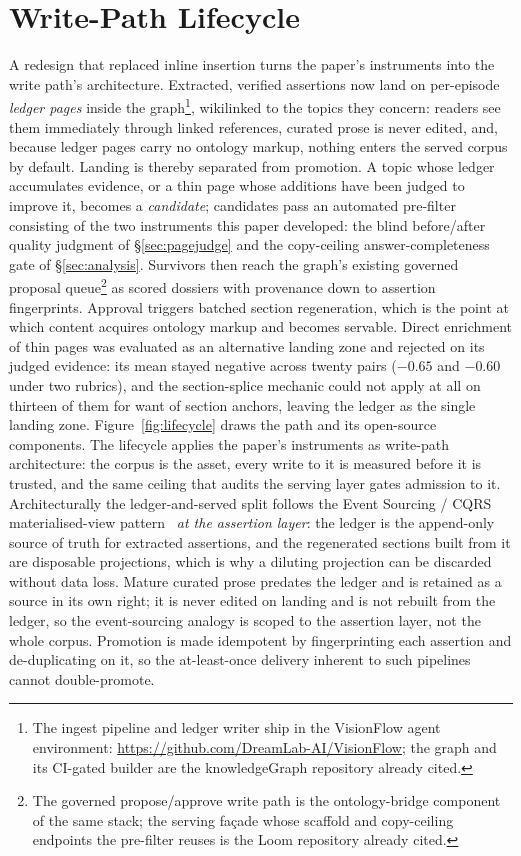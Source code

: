 \documentclass[10pt,twocolumn]{article}
\begin{document}
\section{Write-Path Lifecycle}\label{sec:lifecycle}
A redesign that replaced inline insertion turns the paper's instruments into the write path's
architecture. Extracted, verified assertions now land on per-episode \emph{ledger pages} inside
the graph\footnote{The ingest pipeline and ledger writer ship in the VisionFlow agent
environment: \url{https://github.com/DreamLab-AI/VisionFlow}; the graph and its CI-gated
builder are the knowledgeGraph repository already cited.}, wikilinked to the topics they concern: readers see them immediately through linked
references, curated prose is never edited, and, because ledger pages carry no ontology
markup, nothing enters the served corpus by default. Landing is thereby separated from
promotion. A topic whose ledger accumulates evidence, or a thin page whose additions have been
judged to improve it, becomes a \emph{candidate}; candidates pass an automated pre-filter
consisting of the two instruments this paper developed: the blind before/after quality
judgment of \S\ref{sec:pagejudge} and the copy-ceiling answer-completeness gate of
\S\ref{sec:analysis}. Survivors then reach the graph's existing governed proposal queue\footnote{The governed
propose/approve write path is the ontology-bridge component of the same stack; the serving
fa\c{c}ade whose scaffold and copy-ceiling endpoints the pre-filter reuses is the Loom
repository already cited.} as scored dossiers with provenance down to assertion fingerprints. Approval triggers batched
section regeneration, which is the point at which content acquires ontology markup and becomes
servable. Direct enrichment of thin pages was evaluated as an alternative landing zone and rejected
on its judged evidence: its mean stayed negative across twenty pairs ($-0.65$ and $-0.60$ under two
rubrics), and the section-splice mechanic could not apply at all on thirteen of them for want of
section anchors, leaving the ledger as the single landing zone. Figure~\ref{fig:lifecycle} draws the
path and its open-source components. The lifecycle applies the paper's instruments as write-path
architecture: the corpus is the asset, every write to it is measured before it is trusted, and the
same ceiling that audits the serving layer gates admission to it. Architecturally the
ledger-and-served split follows the Event Sourcing / CQRS materialised-view pattern~\cite{fowler2005eventsourcing}
\emph{at the assertion layer}: the ledger is the append-only source of truth for extracted
assertions, and the regenerated sections built from it are disposable projections, which is why a
diluting projection can be discarded without data loss. Mature curated prose predates the ledger
and is retained as a source in its own right; it is never edited on landing and is not rebuilt from
the ledger, so the event-sourcing analogy is scoped to the assertion layer, not the whole corpus. Promotion is
made idempotent by fingerprinting each assertion and de-duplicating on it, so the at-least-once
delivery inherent to such pipelines cannot double-promote.
\end{document}
